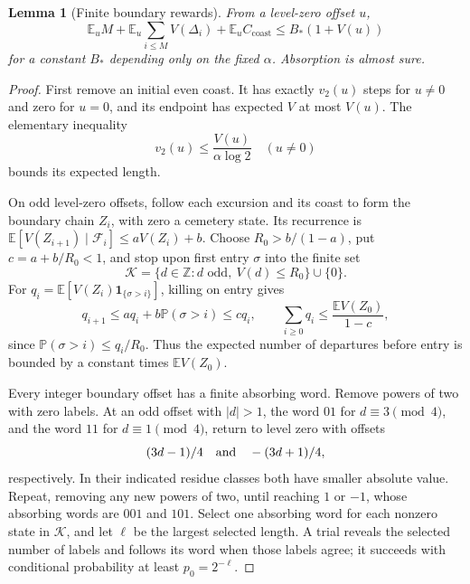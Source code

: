 \documentclass[11pt]{amsart}
\newtheorem{lemma}[theorem]{Lemma}
\theoremstyle{definition}
\theoremstyle{remark}
\newcommand{\Z}{\mathbb Z}
\newcommand{\E}{\mathbb E}
\newcommand{\PP}{\mathbb P}
\newcommand{\one}{\mathbf 1}
\begin{document}
\begin{lemma}[Finite boundary rewards]\label{pair:rewards}
From a level-zero offset $u$,
\begin{equation}\label{pair:rewardbound}
 \E_u M+\E_u\sum_{i\le M}V(\Delta_i)+\E_u C_{\mathrm{coast}}
 \le B_*(1+V(u))
\end{equation}
for a constant $B_*$ depending only on the fixed $\alpha$.  Absorption is
almost sure.
\end{lemma}
\begin{proof}
First remove an initial even coast.  It has exactly $v_2(u)$ steps for
$u\ne0$ and zero for $u=0$, and its endpoint has expected $V$ at most
$V(u)$.  The elementary inequality
\begin{equation}\label{pair:coastbound}
 v_2(u)\le\frac{V(u)}{\alpha\log2}\quad(u\ne0)
\end{equation}
bounds its expected length.

On odd level-zero offsets, follow each excursion and its coast to form
the boundary chain $Z_i$, with zero a cemetery state.  Its recurrence is
$\E[V(Z_{i+1})\mid\mathcal F_i]\le aV(Z_i)+b$.
Choose $R_0>b/(1-a)$, put $c=a+b/R_0<1$, and stop upon first entry
$\sigma$ into the finite set
\[
 \mathcal K=\{d\in\Z:d\text{ odd},\ V(d)\le R_0\}\cup\{0\}.
\]
For $q_i=\E[V(Z_i)\one_{\{\sigma>i\}}]$, killing on entry gives
\begin{equation}\label{pair:killedrecurrence}
 q_{i+1}\le aq_i+b\PP(\sigma>i)\le cq_i,
 \qquad \sum_{i\ge0}q_i\le\frac{\E V(Z_0)}{1-c},
\end{equation}
since $\PP(\sigma>i)\le q_i/R_0$.  Thus the expected number of departures
before entry is bounded by a constant times $\E V(Z_0)$.

Every integer boundary offset has a finite absorbing word.  Remove powers
of two with zero labels.  At an odd offset with $|d|>1$, the word $01$
for $d\equiv3\pmod4$, and the word $11$ for $d\equiv1\pmod4$, return
to level zero with offsets
\[
 (3d-1)/4\quad\hbox{and}\quad -(3d+1)/4,
\]
respectively.  In their indicated residue classes both have smaller
absolute value.  Repeat, removing any new powers of two, until reaching
$1$ or $-1$, whose absorbing words are $001$ and $101$.  Select one
absorbing word for each nonzero state in $\mathcal K$, and let $\ell$
be the largest selected length.  A trial reveals the selected number of
labels and follows its word when those labels agree; it succeeds with
conditional probability at least $p_0=2^{-\ell}$.


\end{proof}
\end{document}
